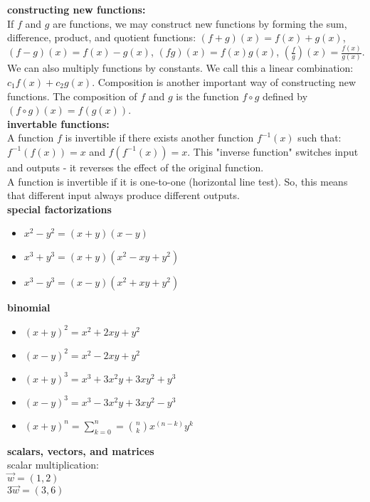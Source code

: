 \documentclass{article}
\begin{document}
\textbf{constructing new functions:}\\
If $f$ and $g$ are functions, we may construct new functions by forming the sum, difference, product, and quotient functions: $(f + g)(x) = f(x) + g(x)$, $(f - g)(x) = f(x) - g(x)$, $(fg)(x) = f(x)g(x)$, $(\frac{f}{g})(x) = \frac{f(x)}{g(x)}$. We can also multiply functions by constants. We call this a linear combination: $c_1f(x) + c_2g(x)$. Composition is another important way of constructing new functions. The composition of $f$ and $g$ is the function $f \circ g$ defined by $(f \circ g)(x) = f(g(x))$.\\

\textbf{invertable functions:}\\
A function $f$ is invertible if there exists another function $f^{-1}(x)$ such that: $f^{-1}(f(x)) = x$ and $f(f^{-1}(x)) = x$. This "inverse function" switches input and outputs - it reverses the effect of the original function.\\

A function is invertible if it is one-to-one (horizontal line test). So, this means that different input always produce different outputs.\\

\textbf{special factorizations}
	\begin{itemize}
		\item $x^2 - y^2 = (x + y)(x - y)$
		\item $x^3 + y^3 = (x + y)(x^2 - xy + y^2)$
		\item $x^3 - y^3 = (x - y)(x^2 + xy + y^2)$
	\end{itemize}

\textbf{binomial}
	\begin{itemize}
		\item $(x + y)^2 = x^2 + 2xy + y^2$
		\item $(x - y)^2 = x^2 - 2xy + y^2$
		\item $(x + y)^3 = x^3 + 3x^2y + 3xy^2 + y^3$
		\item $(x - y)^3 = x^3 - 3x^2y + 3xy^2 - y^3$
		\item $(x + y)^n = \sum_{k = 0}^{n} = \binom{n}{k}x^{(n-k)}y^{k}$  
	\end{itemize}

\textbf{scalars, vectors, and matrices}\\

scalar multiplication:\\
$\vec{w} = (1 , 2)$\\
$3\vec{w} = (3, 6)$\\
\end{document}
